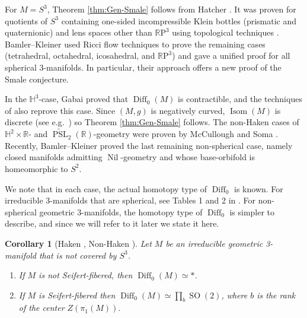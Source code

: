\documentclass{amsart}
\theoremstyle{plain}
\newtheorem{cor}[thm]{Corollary}
\theoremstyle{definition}
\DeclareMathOperator\Diff{Diff}
\DeclareMathOperator\Isom{Isom}
\DeclareMathOperator\SO{SO}
\DeclareMathOperator\PSL{PSL}
\DeclareMathOperator\Nil{Nil}
\newcommand{\bbR}{\mathbb{R}}
\newcommand{\bbH}{\mathbb{H}}
\newcommand{\RP}{\mathbb{R}\mathrm{P}}
\begin{document}
For $M=S^3$, Theorem \ref{thm:Gen-Smale} follows from Hatcher \cite{Hatcher}. 
It was proven for quotients of $S^3$ containing one-sided incompressible Klein bottles (prismatic and quaternionic) and lens spaces other than $\RP^3$ using topological techniques \cite{Ivanov79,Ivanov82,HKMR12}. Bamler--Kleiner \cite{BK23, BK19} used Ricci flow techniques to prove the remaining cases (tetrahedral, octahedral, icosahedral, and $\RP^3$) and gave a unified proof for all spherical 3-manifolds. In particular, their approach offers a new proof of the Smale conjecture.

In the $\bbH^3$-case, Gabai \cite{Gabai01} proved that $\Diff_0(M)$ is contractible, and the techniques of \cite{BK23} also reprove this case. Since $(M,g)$ is negatively curved, $\Isom(M)$ is discrete (see {e.g.}~\cite[Corollary 5.4]{KobayashiNomizu}) so Theorem \ref{thm:Gen-Smale} follows. The non-Haken cases of $\bbH^2\times\bbR$- and $\widetilde{\PSL}_2(\bbR)$-geometry were proven by McCullough and Soma \cite{McCulloughSoma13}. Recently, Bamler--Kleiner \cite{BamlerKleiner2023} proved the last remaining non-spherical case, namely closed manifolds admitting $\Nil$-geometry and whose base-orbifold is homeomorphic to $S^2$.

We note that in each case, the actual homotopy type of $\Diff_0$ is known. For irreducible 3-manifolds that are spherical, see Tables 1 and 2 in \cite{HKMR12}. For non-spherical geometric 3-manifolds, the homotopy type of $\Diff_0$ is simpler to describe, and since we will refer to it later we state it here. 
\begin{cor}[Haken \cite{Hatcher76,Ivanov76,Ivanov79}, Non-Haken \cite{McCulloughSoma13,BamlerKleiner2023}]\label{cor:Diff0-list}
    Let $M$ be an irreducible geometric 3-manifold that is not covered by $S^3$.
    \begin{enumerate}
        \item If $M$ is not Seifert-fibered, then $\Diff_0(M)\simeq *$.
        \item If $M$ is Seifert-fibered  then $\displaystyle\Diff_0(M)\simeq \prod_{b}\SO(2)$, where $b$ is the rank of the center $Z(\pi_1(M))$.
    \end{enumerate}
\end{cor}
\end{document}
